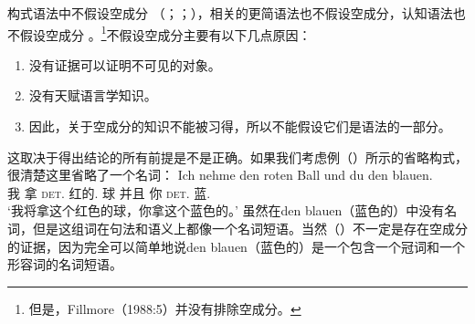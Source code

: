 构式语法中不假设空成分\indexcxgc\label{Seite-leere-Elemente-CxG} （\citealp[--50]{MR2001a}；\citealp[]{Goldberg2003b}；\citealp[]{Goldberg2006a}），相关的更简语法\citep{CJ2005a}也不假设空成分，认知语法也不假设空成分 。\footnote{%
  但是，Fillmore（1988:5）并没有排除空成分。
}不假设空成分主要有以下几点原因：
\begin{enumerate}
\item 没有证据可以证明不可见的对象。
\item 没有天赋语言学知识。
\item 因此，关于空成分的知识不能被习得，所以不能假设它们是语法的一部分。
\end{enumerate}
这取决于得出结论的所有前提是不是正确。如果我们考虑例（）所示的省略构式，很清楚这里省略了一个名词：
\ea
\gll Ich nehme den roten Ball und du den blauen.\\
	 我 拿 \textsc{det}.\acc{} 红的.\acc{} 球 并且 你 \textsc{det}.\acc{} 蓝.\acc{}\\
\glt `我将拿这个红色的球，你拿这个蓝色的。'
\z
虽然在den blauen（蓝色的）中没有名词，但是这组词在句法和语义上都像一个名词短语。当然（）不一定是存在空成分的证据，因为完全可以简单地说den blauen（蓝色的）是一个包含一个冠词和一个形容词的名词短语\citep{Wunderlich87d}。

